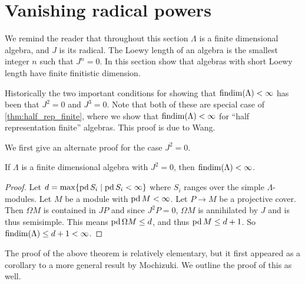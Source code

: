 \section{Vanishing radical powers}\label{sec:vanishing_radical}

We remind the reader that throughout this section $\Lambda$ is a finite dimensional algebra, and $J$ is its radical. The Loewy length of an algebra is the smallest integer $n$ such that $J^n = 0$. In this section show that algebras with short Loewy length have finite finitistic dimension.

Historically the two important conditions for showing that $\operatorname{findim}(\Lambda) < \infty$ has been that $J^2=0$ and $J^3=0$. Note that both of these are special case of \cref{thm:half_rep_finite}, where we show that $\operatorname{findim}(\Lambda) < \infty$ for ``half representation finite'' algebras. This proof is due to Wang\cite{Wang94}.

We first give an alternate proof for the case $J^2=0$.

\begin{theorem}\label{thm:J2_equals_0_implies_FDC}
	If $\Lambda$ is a finite dimensional algebra with $J^2=0$, then $\operatorname{findim}(\Lambda) < \infty$.
	\begin{proof}
		Let $d = \max\{\operatorname{pd} S_i \mid \operatorname{pd} S_i < \infty\}$ where $S_i$ ranges over the simple $\Lambda$-modules. Let $M$ be a module with $\operatorname{pd} M < \infty$. Let $P \to M$ be a projective cover. Then $\Omega M$ is contained in $JP$ and since $J^2P=0$, $\Omega M$ is annihilated by $J$ and is thus semisimple. This means $\operatorname{pd} \Omega M \leq d$, and thus $\operatorname{pd} M \leq d+1$. So $\operatorname{findim}(\Lambda) \leq d+1 < \infty$.
	\end{proof}
\end{theorem}

The proof of the above theorem is relatively elementary, but it first appeared as a corollary to a more general result by Mochizuki\cite{Moc65}. We outline the proof of this as well.

